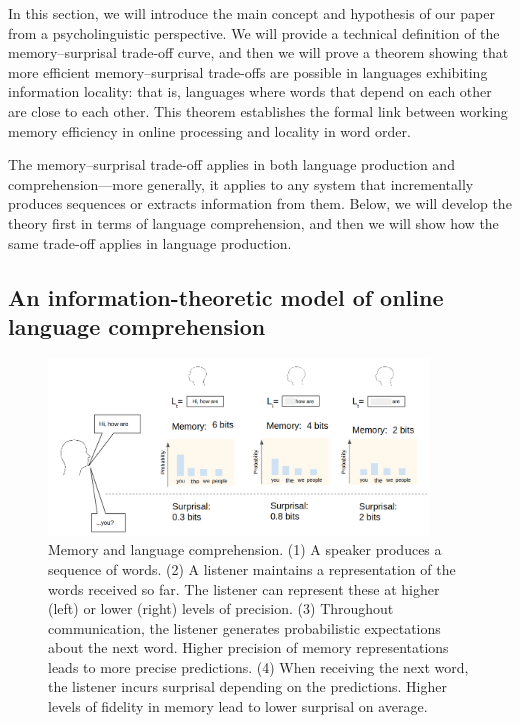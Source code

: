 In this section, we will introduce the main concept and hypothesis of our paper from a psycholinguistic perspective. We will provide a technical definition of the memory--surprisal trade-off curve, and then we will prove a theorem showing that more efficient memory--surprisal trade-offs are possible in languages exhibiting information locality: that is, languages where words that depend on each other are close to each other. This theorem establishes the formal link between working memory efficiency in online processing and locality in word order.

The memory--surprisal trade-off applies in both language production and comprehension---more generally, it applies to any system that incrementally produces sequences or extracts information from them. Below, we will develop the theory first in terms of language comprehension, and then we will show how the same trade-off applies in language production.

\subsection{An information-theoretic model of online language comprehension}
\label{sec:listener-tradeoff}

\begin{figure}
\centering
\includegraphics[width=0.9\textwidth]{figures-gdrive/communication.png}
	\caption{Memory and language comprehension. (1) A speaker produces a sequence of words. (2) A listener maintains a representation of the words received so far. The listener can represent these at higher (left) or lower (right) levels of precision. (3) Throughout communication, the listener generates probabilistic expectations about the next word. Higher precision of memory representations leads to more precise predictions. (4) When receiving the next word, the listener incurs surprisal depending on the predictions. Higher levels of fidelity in memory lead to lower surprisal on average.  }
	\label{fig:communication}
\end{figure}

